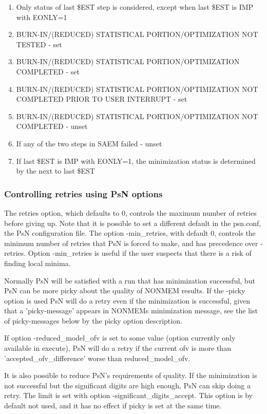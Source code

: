 \begin{enumerate}
\item Only status of last \$EST step is considered, except when last \$EST is IMP with EONLY=1
\item BURN-IN/(REDUCED) STATISTICAL PORTION/OPTIMIZATION NOT TESTED - set
\item BURN-IN/(REDUCED) STATISTICAL PORTION/OPTIMIZATION COMPLETED -  set
\item BURN-IN/(REDUCED) STATISTICAL PORTION/OPTIMIZATION NOT COMPLETED PRIOR TO USER INTERRUPT - set
\item BURN-IN/(REDUCED) STATISTICAL PORTION/OPTIMIZATION NOT COMPLETED - unset
\item If any of the two steps in SAEM failed - unset 
\item If last \$EST is IMP with EONLY=1, the minimization status is determined by the next to last \$EST
\end{enumerate}

\subsubsection{Controlling retries using PsN options}
The retries option, which defaults to 0, controls the maximum number of retries before giving up. Note that it is 
possible to set a different default in the psn.conf, the PsN configuration file. The option -min\_retries, 
with default 0, controls the minimum number of retries that PsN is forced to make, and has precedence over -retries. 
Option -min\_retries is useful if the user suspects that there is a risk of finding local minima.

Normally PsN will be satisfied with a run that has minimization successful, but PsN can be more picky about the 
quality of NONMEM results. If the -picky option is used PsN will do a retry even if the minimization is successful, 
given that a 'picky-message' appears in NONMEMs minimization message, see the list of picky-messages below by the picky option description.

If option -reduced\_model\_ofv is set to some value (option currently only available in execute),
PsN will do a retry if the current ofv is more than 'accepted\_ofv\_difference' worse than
reduced\_model\_ofv.

It is also possible to reduce PsN's requirements of quality. If the minimization is not successful but the significant 
digits are high enough, PsN can skip doing a retry. The limit is set with option -significant\_digits\_accept. This option 
is by default not used, and it has no effect if picky is set at the same time.

